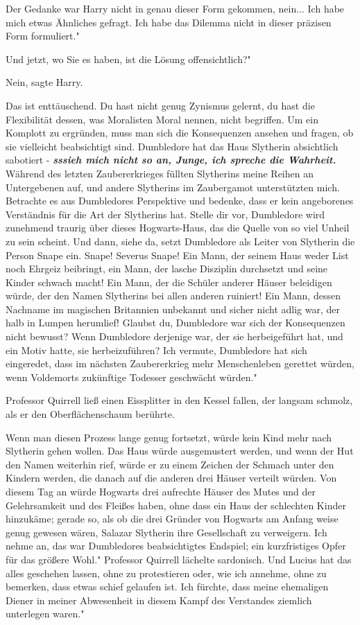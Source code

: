 Der Gedanke war Harry nicht in genau dieser Form gekommen, nein... \glqq{}Ich
habe mich etwas Ähnliches gefragt. Ich habe das Dilemma nicht in dieser präzisen
Form formuliert."

\glqq{}Und jetzt, wo Sie es haben, ist die Lösung offensichtlich?"

\glqq{}Nein\grqq{}, sagte Harry.

\glqq{}Das ist enttäuschend. Du hast nicht genug Zynismus gelernt, du hast die
Flexibilität dessen, was Moralisten Moral nennen, nicht begriffen. Um ein
Komplott zu ergründen, muss man sich die Konsequenzen ansehen und fragen, ob sie
vielleicht beabsichtigt sind. Dumbledore hat das Haus Slytherin absichtlich
sabotiert - \textbf{\emph{sssieh mich nicht so an, Junge, ich spreche die
Wahrheit.}} Während des letzten Zaubererkrieges füllten Slytherins meine Reihen
an Untergebenen auf, und andere Slytherins im Zaubergamot unterstützten mich.
Betrachte es aus Dumbledores Perspektive und bedenke, dass er kein angeborenes
Verständnis für die Art der Slytherins hat. Stelle dir vor, Dumbledore wird
zunehmend traurig über dieses Hogwarts-Haus, das die Quelle von so viel Unheil
zu sein scheint. Und dann, siehe da, setzt Dumbledore als Leiter von Slytherin
die Person Snape ein. Snape! Severus Snape! Ein Mann, der seinem Haus weder List
noch Ehrgeiz beibringt, ein Mann, der lasche Disziplin durchsetzt und seine
Kinder schwach macht! Ein Mann, der die Schüler anderer Häuser beleidigen würde,
der den Namen Slytherins bei allen anderen ruiniert! Ein Mann, dessen Nachname
im magischen Britannien unbekannt und sicher nicht adlig war, der halb in Lumpen
herumlief! Glaubst du, Dumbledore war sich der Konsequenzen nicht bewusst? Wenn
Dumbledore derjenige war, der sie herbeigeführt hat, und ein Motiv hatte, sie
herbeizuführen? Ich vermute, Dumbledore hat sich eingeredet, dass im nächsten
Zaubererkrieg mehr Menschenleben gerettet würden, wenn Voldemorts zukünftige
Todesser geschwächt würden."

Professor Quirrell ließ einen Eissplitter in den Kessel fallen, der langsam
schmolz, als er den Oberflächenschaum berührte.

\glqq{}Wenn man diesen Prozess lange genug fortsetzt, würde kein Kind mehr nach
Slytherin gehen wollen. Das Haus würde ausgemustert werden, und wenn der Hut den
Namen weiterhin rief, würde er zu einem Zeichen der Schmach unter den Kindern
werden, die danach auf die anderen drei Häuser verteilt würden. Von diesem Tag
an würde Hogwarts drei aufrechte Häuser des Mutes und der Gelehrsamkeit und des
Fleißes haben, ohne dass ein Haus der schlechten Kinder hinzukäme; gerade so,
als ob die drei Gründer von Hogwarts am Anfang weise genug gewesen wären,
Salazar Slytherin ihre Gesellschaft zu verweigern. Ich nehme an, das war
Dumbledores beabsichtigtes Endspiel; ein kurzfristiges Opfer für das größere
Wohl." Professor Quirrell lächelte sardonisch. \glqq{}Und Lucius hat das alles
geschehen lassen, ohne zu protestieren oder, wie ich annehme, ohne zu bemerken,
dass etwas schief gelaufen ist. Ich fürchte, dass meine ehemaligen Diener in
meiner Abwesenheit in diesem Kampf des Verstandes ziemlich unterlegen waren."

